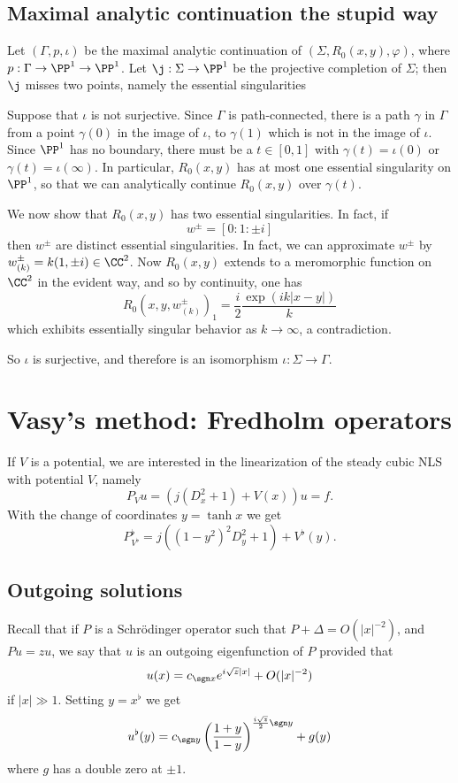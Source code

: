 \subsection{Maximal analytic continuation the stupid way}
Let $(\Gamma, p, \iota)$ be the maximal analytic continuation of $(\Sigma, R_0(x, y), \varphi)$, where $p: \Gamma \to \PP^1 \to \PP^1$.
Let $\j: \Sigma \to \PP^1$ be the projective completion of $\Sigma$; then $\j$ misses two points, namely the essential singularities

Suppose that $\iota$ is not surjective.
Since $\Gamma$ is path-connected, there is a path $\gamma$ in $\Gamma$ from a point $\gamma(0)$ in the image of $\iota$, to $\gamma(1)$ which is not in the image of $\iota$.
Since $\PP^1$ has no boundary, there must be a $t \in [0, 1]$ with $\gamma(t) = \iota(0)$ or $\gamma(t) = \iota(\infty)$.
In particular, $R_0(x, y)$ has at most one essential singularity on $\PP^1$, so that we can analytically continue $R_0(x, y)$ over $\gamma(t)$.

We now show that $R_0(x, y)$ has two essential singularities.
In fact, if
$$w^\pm = [0:1:\pm i]$$
then $w^\pm$ are distinct essential singularities.
In fact, we can approximate $w^\pm$ by $w^\pm_{(k)} = k(1, \pm i) \in \CC^2$.
Now $R_0(x, y)$ extends to a meromorphic function on $\CC^2$ in the evident way, and so by continuity, one has
$$R_0(x, y, w^\pm_{(k)})_1 = \frac{i}{2} \frac{\exp(ik|x-y|)}{k}$$
which exhibits essentially singular behavior as $k \to \infty$, a contradiction.

So $\iota$ is surjective, and therefore is an isomorphism $\iota: \Sigma \to \Gamma$.


\section{Vasy's method: Fredholm operators}

If $V$ is a potential, we are interested in the linearization of the steady cubic NLS with potential $V$, namely
$$P_Vu = (j(D_x^2 + 1) + V(x))u = f.$$
With the change of coordinates $y = \tanh x$
we get
$$P_{V^\flat}^\flat = j((1 - y^2)^2 D_y^2 + 1) + V^\flat(y).$$

\subsection{Outgoing solutions}
Recall that if $P$ is a Schr\"odinger operator such that $P + \Delta = O(|x|^{-2})$, and $Pu = zu$, we say that $u$ is an outgoing eigenfunction of $P$ provided that
$$u(x) = c_{\sgn x} e^{i\sqrt z|x|} + O(|x|^{-2})$$
if $|x| \gg 1$. Setting $y = x^\flat$ we get
$$u^\flat(y) = c_{\sgn y} \left(\frac{1 + y}{1 - y}\right)^{\frac{i\sqrt z}{2}\sgn y} + g(y)$$
where $g$ has a double zero at $\pm 1$.

